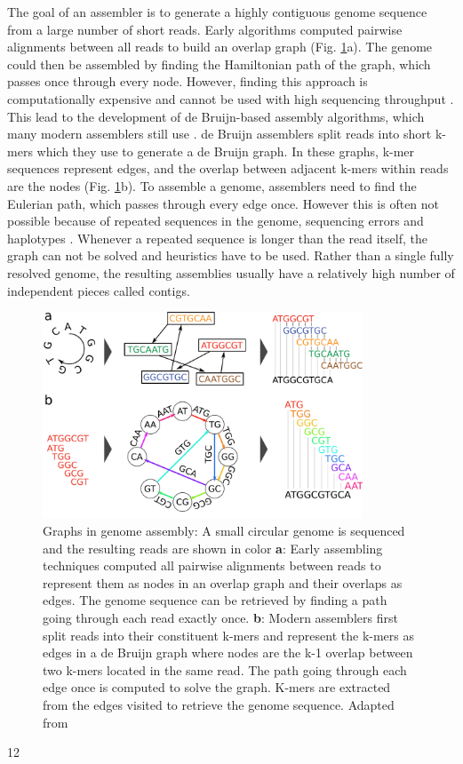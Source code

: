 The goal of an assembler is to generate a highly contiguous genome sequence from a large number of short reads. Early algorithms computed pairwise alignments between all reads to build an overlap graph (Fig. \ref{fig:01-03:debruijn}a). The genome could then be assembled by finding the Hamiltonian path of the graph, which passes once through every node. However, finding this approach is computationally expensive and cannot be used with high sequencing throughput \cite{compeauHowApplyBruijn2011}. This lead to the development of de Bruijn-based assembly algorithms, which many modern assemblers still use \citep{simpsonABySSParallelAssembler2009,zerbinoVelvetAlgorithmsNovo2008}. de Bruijn assemblers split reads into short \Gls{k-mer}s which they use to generate a de Bruijn graph. In these graphs, k-mer sequences represent edges, and the overlap between adjacent k-mers within reads are the nodes (Fig. \ref{fig:01-03:debruijn}b). To assemble a genome, assemblers need to find the Eulerian path, which passes through every edge once. However this is often not possible because of repeated sequences in the genome, sequencing errors and haplotypes \cite{simpsonTheoryPracticeGenome2015}. Whenever a repeated sequence is longer than the read itself, the graph can not be solved and heuristics have to be used. Rather than a single fully resolved genome, the resulting assemblies usually have a relatively high number of independent pieces called \Gls{contig}s.

\begin{figure}
\centering
\includegraphics[width=0.85\textwidth]{Parts/Part01/gfx/debruijn.pdf}
\caption[Graphs in genome assembly.]{Graphs in genome assembly: A small circular genome is sequenced and the resulting reads are shown in color \textbf{a}: Early assembling techniques computed all pairwise alignments between reads to represent them as nodes in an overlap graph and their overlaps as edges. The genome sequence can be retrieved by finding a path going through each read exactly once. \textbf{b}: Modern assemblers first split reads into their constituent k-mers and represent the k-mers as edges in a de Bruijn graph where nodes are the k-1 overlap between two k-mers located in the same read. The path going through each edge once is computed to solve the graph. K-mers are extracted from the edges visited to retrieve the genome sequence. Adapted from \cite{compeauHowApplyBruijn2011}}
\label{fig:01-03:debruijn}
\end{figure}12

